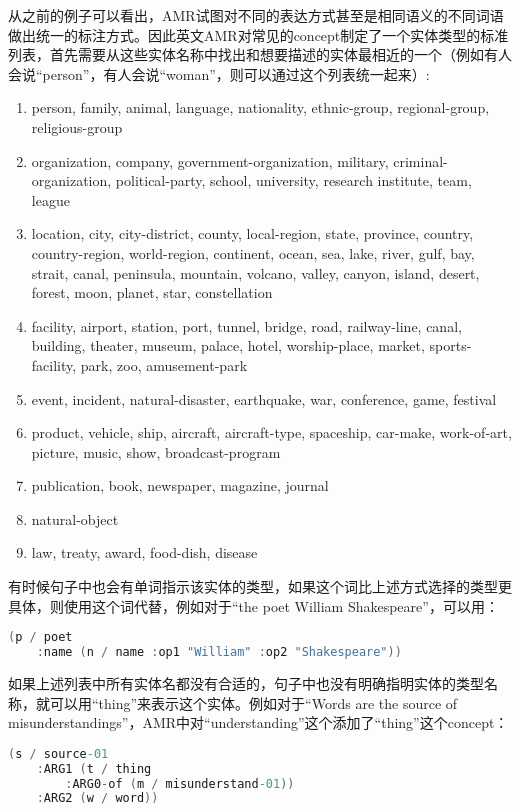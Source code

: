 \documentclass[master, winfont]{njuthesis}
\begin{document}
从之前的例子可以看出，AMR试图对不同的表达方式甚至是相同语义的不同词语做出统一的标注方式。因此英文AMR对常见的concept制定了一个实体类型的标准列表，首先需要从这些实体名称中找出和想要描述的实体最相近的一个（例如有人会说“person”，有人会说“woman”，则可以通过这个列表统一起来）:
\begin{enumerate}
  \item person, family, animal, language, nationality, ethnic-group, regional-group, religious-group
  \item organization, company, government-organization, military, criminal-organization, political-party, school, university, research institute, team, league
  \item location, city, city-district, county, local-region, state, province, country, country-region, world-region, continent, ocean, sea, lake, river, gulf, bay, strait, canal, peninsula, mountain, volcano, valley, canyon, island, desert, forest, moon, planet, star, constellation
  \item facility, airport, station, port, tunnel, bridge, road, railway-line, canal, building, theater, museum, palace, hotel, worship-place, market, sports-facility, park, zoo, amusement-park
  \item event, incident, natural-disaster, earthquake, war, conference, game, festival
  \item product, vehicle, ship, aircraft, aircraft-type, spaceship, car-make, work-of-art, picture, music, show, broadcast-program
  \item publication, book, newspaper, magazine, journal
  \item natural-object
  \item law, treaty, award, food-dish, disease
\end{enumerate}

有时候句子中也会有单词指示该实体的类型，如果这个词比上述方式选择的类型更具体，则使用这个词代替，例如对于“the poet William Shakespeare”，可以用：
\begin{lstlisting}[language=C]
(p / poet
	:name (n / name :op1 "William" :op2 "Shakespeare"))
\end{lstlisting}

如果上述列表中所有实体名都没有合适的，句子中也没有明确指明实体的类型名称，就可以用“thing”来表示这个实体。例如对于“Words are the source of misunderstandings”，AMR中对“understanding”这个添加了“thing”这个concept：
\begin{lstlisting}[language=C]
(s / source-01
	:ARG1 (t / thing
		:ARG0-of (m / misunderstand-01))
	:ARG2 (w / word))
\end{lstlisting}
\end{document}
